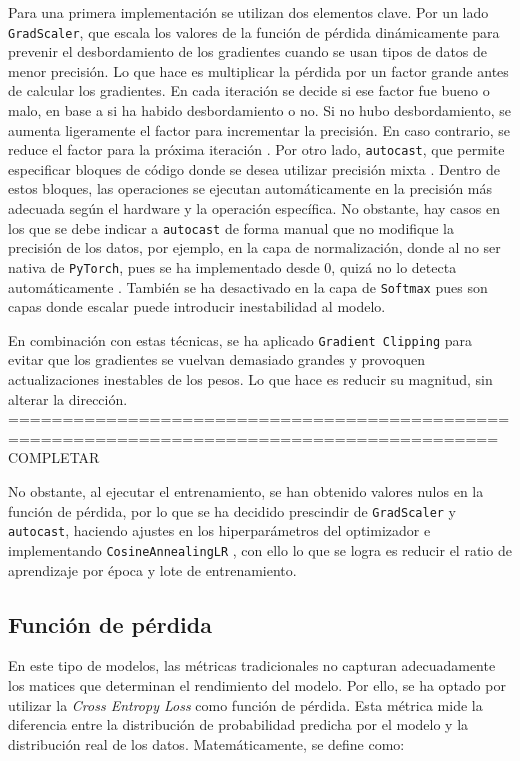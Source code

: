 \documentclass[11pt]{book}
\begin{document}
Para una primera implementación se utilizan dos elementos clave. Por un lado \texttt{GradScaler}, que escala los valores de la función de pérdida dinámicamente para prevenir el desbordamiento de los gradientes cuando se usan tipos de datos de menor precisión. Lo que hace es multiplicar la pérdida por un factor grande antes de calcular los gradientes. En cada iteración se decide si ese factor fue bueno o malo, en base a si ha habido desbordamiento o no. Si no hubo desbordamiento, se aumenta ligeramente el factor para incrementar la precisión. En caso contrario, se reduce el factor para la próxima iteración \parencite{amit2024mixedprecision}. Por otro lado, \texttt{autocast}, que permite especificar bloques de código donde se desea utilizar precisión mixta \parencite{stack_overflow_gradscaler}. Dentro de estos bloques, las operaciones se ejecutan automáticamente en la precisión más adecuada según el hardware y la operación específica. No obstante, hay casos en los que se debe indicar a \texttt{autocast} de forma manual que no modifique la precisión de los datos, por ejemplo, en la capa de normalización, donde al no ser nativa de \texttt{PyTorch}, pues se ha implementado desde 0, quizá no lo detecta automáticamente \parencite{amit2024mixedprecision}. También se ha desactivado en la capa de \texttt{Softmax} pues son capas donde escalar puede introducir inestabilidad al modelo.

En combinación con estas técnicas, se ha aplicado \texttt{Gradient Clipping} para evitar que los gradientes se vuelvan demasiado grandes y provoquen actualizaciones inestables de los pesos. Lo que hace es reducir su magnitud, sin alterar la dirección. 
===========================================================================================
COMPLETAR

No obstante, al ejecutar el entrenamiento, se han obtenido valores nulos en la función de pérdida, por lo que se ha decidido prescindir de \texttt{GradScaler} y \texttt{autocast}, haciendo ajustes en los hiperparámetros del optimizador e implementando \texttt{CosineAnnealingLR} \parencite{pytorch_cosineannealinglr}, con ello lo que se logra es reducir el ratio de aprendizaje por época y lote de entrenamiento. 

\subsection{Función de pérdida}

En este tipo de modelos, las métricas tradicionales no capturan adecuadamente los matices que determinan el rendimiento del modelo. Por ello, se ha optado por utilizar la \textit{Cross Entropy Loss} como función de pérdida. Esta métrica mide la diferencia entre la distribución de probabilidad predicha por el modelo y la distribución real de los datos. 
Matemáticamente, se define como:
\end{document}
